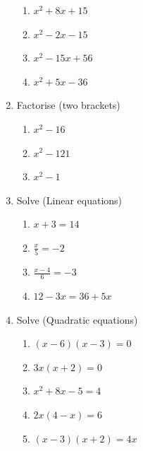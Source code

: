 \documentclass[a4paper,12pt]{article}
\begin{document}
\begin{enumerate}
\begin{multicols}{2}
	\begin{enumerate}[label=\normalsize \alph*)~~~]
		\item $ x^2 + 8x + 15$ 
		\item $x^2 - 2x -15$ 
		\item $x^2 - 15x +56$ 
		\item $ x^2 + 5x -36$ 
	\end{enumerate}
\end{multicols}
\item Factorise (two brackets)
\begin{multicols}{3}
	\begin{enumerate}[label=\normalsize \alph*)~~~]
		\item $ x^2 -16$ 
		\item $x^2 - 121$ 
		\item $x^2 - 1$ 
	\end{enumerate}
\end{multicols}
\item Solve (Linear equations)
\begin{multicols}{2}
	\begin{enumerate}[label=\normalsize \alph*)~~~]
		\item $ x+3 =14$ 
		\item $\displaystyle \frac{x}{5} = -2$ 
		\item $\displaystyle \frac{x-4}{6} = -3$ 
		\item $12 - 3x=36 + 5x$ 
	\end{enumerate}
\end{multicols}
\item Solve (Quadratic equations)
\begin{multicols}{2}
	\begin{enumerate}[label=\normalsize \alph*)~~~]
		\item $ (x-6)(x-3) = 0$ 
		\item $3x(x+2) = 0$ 
		\item $x^2 +8x - 5 = 4$ 
		\item $2x(4-x)=6$ 
			\item $(x-3)(x+2)=4x$ 
	\end{enumerate}
\end{multicols}
\end{enumerate}
\newpage
\end{document}
